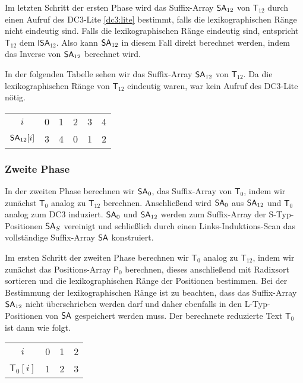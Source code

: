 Im letzten Schritt der ersten Phase wird das Suffix-Array $\sa_{12}$ von $\mathsf{T}_{12}$ durch einen Aufruf des DC3-Lite \cref{dc3:lite} bestimmt, falls die lexikographischen Ränge nicht eindeutig sind. Falls die lexikographischen Ränge eindeutig sind, entspricht $\mathsf{T}_{12}$ dem $\mathsf{ISA}_{12}$. Also kann $\sa_{12}$ in diesem Fall direkt berechnet werden, indem das Inverse von $\sa_{12}$ berechnet wird. \par
In der folgenden Tabelle sehen wir das Suffix-Array $\sa_{12}$ von $\mathsf{T}_{12}$. Da die lexikographischen Ränge von $\mathsf{T}_{12}$ eindeutig waren, war kein Aufruf des DC3-Lite nötig.

\begin{table}[H]
	\footnotesize
	\centering
	\begin{tabular}{c| c c c c c }
		$i$ & 0 & 1 & 2 & 3 & 4 \\
		$\sa_{12}[i]$ & 3 & 4 & 0 & 1 & 2 
	\end{tabular}
\end{table}

\subsubsection{Zweite Phase}

In der zweiten Phase berechnen wir $\sa_0$, das Suffix-Array von $\mathsf{T}_{0}$, indem wir zunächst $\mathsf{T}_{0}$ analog zu $\mathsf{T}_{12}$ berechnen. Anschließend wird $\sa_0$ aus $\sa_{12}$ und $\mathsf{T}_{0}$ analog zum DC3 induziert. $\sa_0$ und $\sa_{12}$ werden zum Suffix-Array der S-Typ-Positionen $\sa_{S}$ vereinigt und schließlich durch einen Links-Induktions-Scan das vollständige Suffix-Array $\sa$ konstruiert. \par
Im ersten Schritt der zweiten Phase berechnen wir $\mathsf{T}_{0}$ analog zu $\mathsf{T}_{12}$, indem wir zunächst das Positions-Array $\mathsf{P}_0$ berechnen, dieses anschließend mit Radixsort sortieren und die lexikographischen Ränge der Positionen bestimmen. Bei der Bestimmung der lexikographischen Ränge ist zu beachten, dass das Suffix-Array $\sa_{12}$ nicht überschrieben werden darf und daher ebenfalls in den L-Typ-Positionen von $\sa$ gespeichert werden muss. Der berechnete reduzierte Text $\mathsf{T}_{0}$ ist dann wie folgt.

\begin{table}[H]
	\footnotesize
	\centering
	\begin{tabular}{c| c c c }
		$i$ & 0 & 1 & 2 \\
		$\mathsf{T}_{0}[i]$ & 1 & 2 & 3 
	\end{tabular}
\end{table}

